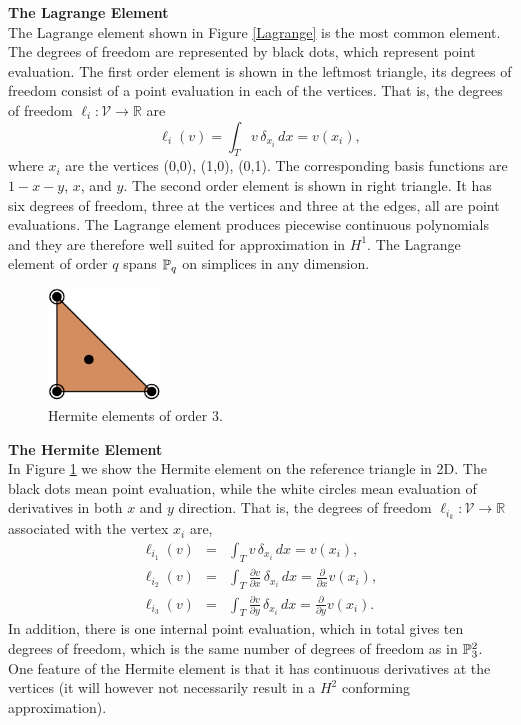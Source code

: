 \begin{example}{\bf{The Lagrange Element}} \\
The Lagrange element shown in Figure \ref{Lagrange} is the most common element.
The degrees of freedom are represented by black dots, which represent point evaluation. 
The first order element is shown in the leftmost triangle, 
its degrees of freedom consist of a point evaluation in each of the vertices. 
That is, the degrees of freedom $\ell_i : \mathcal{V} \rightarrow \mathbb{R}$ are  
\begin{equation}
\ell_i ( v) = \int_{T} v \, \delta_{x_i} \, dx = v(x_i),   
\end{equation}
where $x_i$ are the vertices (0,0), (1,0), (0,1).
The corresponding basis functions
are $1-x-y$, $x$, and $y$.  The second order element is shown in right 
triangle. It has six degrees of freedom, three at the vertices and three
at the edges, all are point evaluations.  
The Lagrange element produces piecewise continuous polynomials and they are therefore
well suited for approximation in $H^1$.
The Lagrange element of order $q$ spans $\P_q$ on simplices in any dimension.  
\end{example}

\begin{figure}
  \begin{center}
    \includegraphics[height=3cm]{chapters/kirby-6/pdf/HER3.pdf}
    \caption{Hermite elements of order 3.}
    \label{Hermite}
  \end{center}
\end{figure}

\begin{example}{\bf{ The Hermite Element}} \\
In Figure \ref{Hermite} we show the Hermite element on the reference triangle in 2D. The black dots mean point
evaluation, while the white circles mean evaluation of derivatives in both $x$ and
$y$ direction. 
That is, the degrees of freedom $\ell_{i_k} : \mathcal{V} \rightarrow \mathbb{R}$ 
associated with the vertex $x_i$ are,  
\begin{eqnarray}
\ell_{i_1} ( v) &=& \int_{T} {v} \, \delta_{x_i} \, dx = v(x_i),    \\
\ell_{i_2} ( v) &=& \int_{T} \frac{\partial{v}}{\partial x} \, \delta_{x_i} \, dx = \frac{\partial}{\partial x} v(x_i),  \\  
\ell_{i_3} ( v) &=& \int_{T} \frac{\partial{v}}{\partial y} \, \delta_{x_i} \, dx = \frac{\partial}{\partial y} v(x_i) .    
\end{eqnarray}
In addition, there is one internal point evaluation, which in total gives ten degrees of freedom, which is the same number
of degrees of freedom as in $\P^2_3$.  One feature of the Hermite element
is that it has continuous derivatives at the vertices (it will however
not necessarily result in a $H^2$ conforming approximation).
\end{example}

